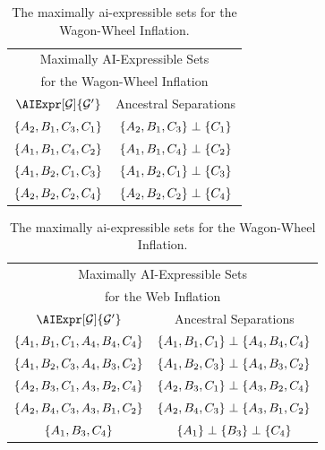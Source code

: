 \documentclass[aps, 10pt, english, twoside, pra, nofootinbib, tightenlines, longbibliography, superscriptaddress]{revtex4-1}
\begin{document}
    \begin{nscenter}
        \begin{table}
        \parbox{.45\linewidth}{
            \centering
            \begin{tabular}{|c|c|}
                \hline
                \multicolumn{2}{|c|}{Maximally AI-Expressible Sets} \\
                \multicolumn{2}{|c|}{for the Wagon-Wheel Inflation} \\
                \hline
                $\AIExpr[\graph]{\graph'}$ & Ancestral Separations \\
                \hline
                $\bc{A_2, B_1, C_3, C_1}$ & $\bc{A_2, B_1, C_3} \ancestralindep \bc{C_1}$ \\
                $\bc{A_1, B_1, C_4, C_2}$ & $\bc{A_1, B_1, C_4} \ancestralindep \bc{C_2}$ \\
                $\bc{A_1, B_2, C_1, C_3}$ & $\bc{A_1, B_2, C_1} \ancestralindep \bc{C_3}$ \\
                $\bc{A_2, B_2, C_2, C_4}$ & $\bc{A_2, B_2, C_2} \ancestralindep \bc{C_4}$ \\
                \hline
            \end{tabular}
            \caption{The maximally ai-expressible sets for the Wagon-Wheel Inflation.
            \label{tab:asexpr_triangle_structure_wagon_wheel}}
        }
        \hfill
        \parbox{.45\linewidth}{
            \centering
            \begin{tabular}{|c|c|}
                \hline
                \multicolumn{2}{|c|}{Maximally AI-Expressible Sets} \\
                \multicolumn{2}{|c|}{for the Web Inflation} \\
                \hline
                $\AIExpr[\graph]{\graph'}$ & Ancestral Separations \\
                \hline
                $\bc{A_1, B_1, C_1, A_4, B_4, C_4}$ & $\bc{A_1, B_1, C_1} \ancestralindep \bc{A_4, B_4, C_4}$ \\
                $\bc{A_1, B_2, C_3, A_4, B_3, C_2}$ & $\bc{A_1, B_2, C_3} \ancestralindep \bc{A_4, B_3, C_2}$ \\
                $\bc{A_2, B_3, C_1, A_3, B_2, C_4}$ & $\bc{A_2, B_3, C_1} \ancestralindep \bc{A_3, B_2, C_4}$ \\
                $\bc{A_2, B_4, C_3, A_3, B_1, C_2}$ & $\bc{A_2, B_4, C_3} \ancestralindep \bc{A_3, B_1, C_2}$ \\
                $\bc{A_1, B_3, C_4}$ & $\bc{A_1} \ancestralindep \bc{B_3} \ancestralindep \bc{C_4}$ \\

\end{tabular}}
\end{table}
\end{nscenter}
\end{document}
